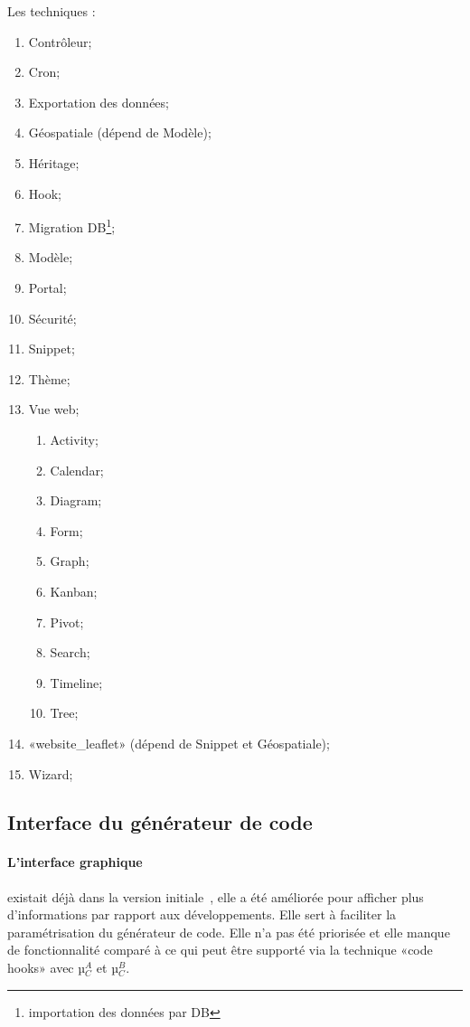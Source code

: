 Les techniques :
\begin{enumerate}
    \item Contrôleur;
    \item Cron;
    \item Exportation des données;
    \item Géospatiale (dépend de Modèle);
    \item Héritage;
    \item Hook;
    \item Migration DB\footnote{importation des données par DB};
    \item Modèle;
    \item Portal;
    \item Sécurité;
    \item Snippet;
    \item Thème;
    \item Vue web;
    \begin{enumerate}
        \item Activity;
        \item Calendar;
        \item Diagram;
        \item Form;
        \item Graph;
        \item Kanban;
        \item Pivot;
        \item Search;
        \item Timeline;
        \item Tree;
    \end{enumerate}
    \item «website\_leaflet» (dépend de Snippet et Géospatiale);
    \item Wizard;
\end{enumerate}

\subsection{Interface du générateur de code}

\paragraph{L'interface graphique}

 existait déjà dans la version initiale~\cite{bluiksnot_repo}, elle a été améliorée pour afficher plus d'informations par rapport aux développements. Elle sert à faciliter la paramétrisation du générateur de code. Elle n’a pas été priorisée et elle manque de fonctionnalité comparé à ce qui peut être supporté via la technique «code hooks» avec µ$_C^A$ et µ$_C^B$.

